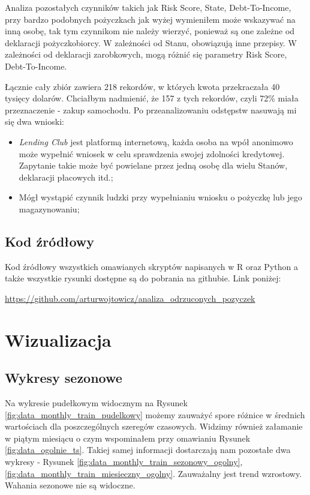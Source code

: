 \documentclass[11pt]{article}
\begin{document}
Analiza pozostałych czynników takich jak Risk Score, State, Debt-To-Income, przy bardzo podobnych pożyczkach jak wyżej wymieniłem może wskazywać na inną osobę, tak tym czynnikom nie należy wierzyć, ponieważ są one zależne od deklaracji pożyczkobiorcy. W zależności od Stanu, obowiązują inne przepisy. W zależności od deklaracji zarobkowych, mogą różnić się parametry Risk Score, Debt-To-Income. 

Łącznie cały zbiór zawiera 218 rekordów, w których kwota przekraczała 40 tysięcy dolarów. Chciałbym nadmienić, że 157 z tych rekordów, czyli 72\% miała przeznaczenie - zakup samochodu.
Po przeanalizowaniu odstępstw nasuwają mi się dwa wnioski:

\begin{itemize}
\item \textit{Lending Club} jest platformą internetową, każda osoba na wpół anonimowo może wypełnić wniosek w celu sprawdzenia swojej zdolności kredytowej. Zapytanie takie może być powielane przez jedną osobę dla wielu Stanów, deklaracji płacowych itd.;
\item Mógł wystąpić czynnik ludzki przy wypełnianiu wniosku o pożyczkę lub jego magazynowaniu;
\end{itemize}

\subsection{Kod źródłowy}

Kod źródłowy wszystkich omawianych skryptów napisanych w R oraz Python a także wszystkie rysunki dostępne są do pobrania na githubie. Link poniżej: 
\begin{center}
\url{https://github.com/arturwojtowicz/analiza_odrzuconych_pozyczek}
\end{center}

\newpage

\section{Wizualizacja}

\subsection{Wykresy sezonowe}

Na wykresie pudełkowym widocznym na Rysunek \ref{fig:data_monthly_train_pudelkowy} możemy zauważyć spore różnice w średnich wartościach dla poszczególnych szeregów czasowych. Widzimy również załamanie w piątym miesiącu o czym wspominałem przy omawianiu Rysunek \ref{fig:data_ogolnie_ts}. Takiej samej informacji dostarczają nam pozostałe dwa wykresy - Rysunek  \ref{fig:data_monthly_train_sezonowy_ogolny}, \ref{fig:data_monthly_train_miesieczny_ogolny}. Zauważalny jest trend wzrostowy. Wahania sezonowe nie są widoczne.
\end{document}
